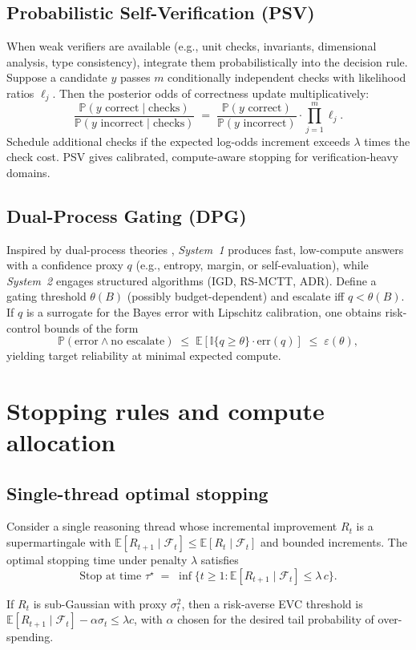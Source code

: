 \documentclass[11pt]{article}
\newcommand{\E}{\mathbb{E}}
\newcommand{\Prob}{\mathbb{P}}
\newcommand{\1}{\mathbb{I}}
\begin{document}
\subsection{Probabilistic Self-Verification (PSV)}

When weak verifiers are available (e.g., unit checks, invariants, dimensional analysis, type consistency), integrate them probabilistically into the decision rule. Suppose a candidate $y$ passes $m$ conditionally independent checks with likelihood ratios $\ell_j$. Then the posterior odds of correctness update multiplicatively:
\begin{equation}
\frac{\Prob(y \text{ correct}\mid \text{checks})}{\Prob(y \text{ incorrect}\mid \text{checks})}
\;=\;
\frac{\Prob(y \text{ correct})}{\Prob(y \text{ incorrect})}
\cdot \prod_{j=1}^m \ell_j.
\end{equation}
Schedule additional checks if the expected log-odds increment exceeds $\lambda$ times the check cost. PSV gives calibrated, compute-aware stopping for verification-heavy domains.

\subsection{Dual-Process Gating (DPG)}

Inspired by dual-process theories \cite{kahneman2011}, \emph{System~1} produces fast, low-compute answers with a confidence proxy $q$ (e.g., entropy, margin, or self-evaluation), while \emph{System~2} engages structured algorithms (IGD, RS-MCTT, ADR).
Define a gating threshold $\theta(B)$ (possibly budget-dependent) and escalate iff $q < \theta(B)$.
If $q$ is a surrogate for the Bayes error with Lipschitz calibration, one obtains risk-control bounds of the form
\[
\Prob(\text{error}\wedge \text{no escalate}) \;\le\; \E[\1\{q \ge \theta\} \cdot \mathrm{err}(q)] \;\le\; \varepsilon(\theta),
\]
yielding target reliability at minimal expected compute.

\section{Stopping rules and compute allocation}

\subsection{Single-thread optimal stopping}
Consider a single reasoning thread whose incremental improvement $R_t$ is a supermartingale with $\E[R_{t+1}\mid \mathcal{F}_t] \le \E[R_t\mid \mathcal{F}_t]$ and bounded increments. The optimal stopping time under penalty $\lambda$ satisfies
\[
\text{Stop at time } \tau^\star \;=\; \inf\{ t \ge 1 : \E[R_{t+1}\mid \mathcal{F}_t] \le \lambda\, c\}.
\]
\begin{proposition}
If $R_t$ is sub-Gaussian with proxy $\sigma_t^2$, then a risk-averse EVC threshold is
$\E[R_{t+1}\mid \mathcal{F}_t] - \alpha \sigma_t \le \lambda c$,
with $\alpha$ chosen for the desired tail probability of over-spending.
\end{proposition}
\end{document}
